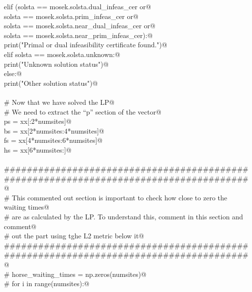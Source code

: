 \documentclass[11.5pt]{report}
\begin{document}
\begin{flushleft}
\begin{list}{}{}
\mbox{}\verb@            elif (solsta == mosek.solsta.dual_infeas_cer or@\\
\mbox{}\verb@                    solsta == mosek.solsta.prim_infeas_cer or@\\
\mbox{}\verb@                    solsta == mosek.solsta.near_dual_infeas_cer or@\\
\mbox{}\verb@                    solsta == mosek.solsta.near_prim_infeas_cer):@\\
\mbox{}\verb@                    print("Primal or dual infeasibility certificate found.\n")@\\
\mbox{}\verb@            elif solsta == mosek.solsta.unknown:@\\
\mbox{}\verb@                    print("Unknown solution status")@\\
\mbox{}\verb@            else:@\\
\mbox{}\verb@                    print("Other solution status")@\\
\mbox{}\verb@@\\
\mbox{}\verb@            # Now that we have solved the LP@\\
\mbox{}\verb@            # We need to extract the ``p'' section of the vector@\\
\mbox{}\verb@            ps = xx[:2*numsites]@\\
\mbox{}\verb@            bs = xx[2*numsites:4*numsites]@\\
\mbox{}\verb@            fs = xx[4*numsites:6*numsites]@\\
\mbox{}\verb@            hs = xx[6*numsites:]@\\
\mbox{}\verb@@\\
\mbox{}\verb@            ######################################################################################@\\
\mbox{}\verb@            # This commented out section is important to check how close to zero the waiting times@\\
\mbox{}\verb@            # are as calculated by the LP. To understand this, comment in this section and comment@\\
\mbox{}\verb@            # out the part using tghe L2 metric below it@\\
\mbox{}\verb@            ######################################################################################@\\
\mbox{}\verb@            # horse_waiting_times = np.zeros(numsites)@\\
\mbox{}\verb@            # for i in range(numsites):@\\

\end{list}
\end{flushleft}
\end{document}
